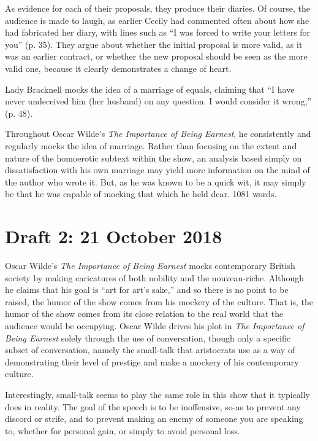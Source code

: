 \documentclass[12pt]{article}[titlepage]
\newcommand{\say}[1]{``#1''}
\newcommand{\1}{\={a}}
\newcommand{\2}{\={e}}
\newcommand{\3}{\={\i}}
\newcommand{\4}{\=o}
\newcommand{\5}{\=u}
\newcommand{\6}{\={A}}
\renewcommand{\,}{\textsuperscript{,}}
\begin{document}
As evidence for each of their proposals, they produce their diaries.
Of course, the audience is made to laugh, as earlier Cecily had commented often about how she had fabricated her diary, with lines such as \say{I was forced to write your letters for you} (p. 35).
They argue about whether the initial proposal is more valid, as it was an earlier contract, or whether the new proposal should be seen as the more valid one, because it clearly demonstrates a change of heart.

Lady Bracknell mocks the idea of a marriage of equals, claiming that \say{I have never undeceived him (her husband) on any question. I would consider it wrong,} (p. 48).

Throughout Oscar Wilde's \textit{The Importance of Being Earnest}, he consistently and regularly mocks the idea of marriage.
Rather than focusing on the extent and nature of the homoerotic subtext within the show, an analysis based simply on dissatisfaction with his own marriage may yield more information on the mind of the author who wrote it.
But, as he was known to be a quick wit, it may simply be that he was capable of mocking that which he held dear.
1081 words.

\section{Draft 2: 21 October 2018}
Oscar Wilde's \textit{The Importance of Being Earnest} mocks contemporary British society by making caricatures of both nobility and the nouveau-riche.
Although he claims that his goal is \say{art for art's sake,} and so there is no point to be raised, the humor of the show comes from his mockery of the culture.
That is, the humor of the show comes from its close relation to the real world that the audience would be occupying.
Oscar Wilde drives his plot in \textit{The Importance of Being Earnest} solely through the use of conversation, though only a specific subset of conversation, namely the small-talk that aristocrats use as a way of demonstrating their level of prestige and make a mockery of his contemporary culture.

Interestingly, small-talk seems to play the same role in this show that it typically does in reality.
The goal of the speech is to be inoffensive, so-as to prevent any discord or strife, and to prevent making an enemy of someone you are speaking to, whether for personal gain, or simply to avoid personal loss.
\end{document}
